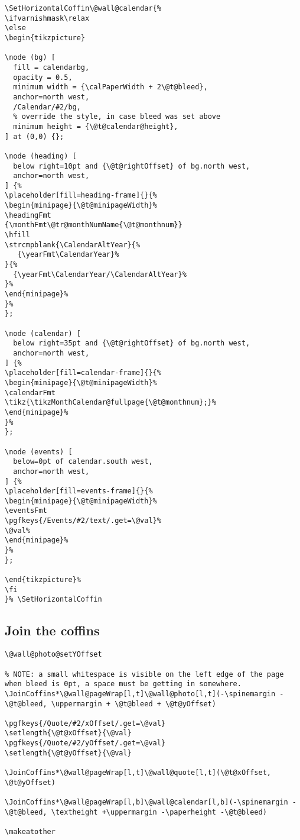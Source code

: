 \documentclass[11pt,oneside]{memoir-article}
\begin{document}
\begin{verbatim}
\SetHorizontalCoffin\@wall@calendar{%
\ifvarnishmask\relax
\else
\begin{tikzpicture}

\node (bg) [
  fill = calendarbg,
  opacity = 0.5,
  minimum width = {\calPaperWidth + 2\@t@bleed},
  anchor=north west,
  /Calendar/#2/bg,
  % override the style, in case bleed was set above
  minimum height = {\@t@calendar@height},
] at (0,0) {};

\node (heading) [
  below right=10pt and {\@t@rightOffset} of bg.north west,
  anchor=north west,
] {%
\placeholder[fill=heading-frame]{}{%
\begin{minipage}{\@t@minipageWidth}%
\headingFmt
{\monthFmt\@tr@monthNumName{\@t@monthnum}}
\hfill
\strcmpblank{\CalendarAltYear}{%
   {\yearFmt\CalendarYear}%
}{%
  {\yearFmt\CalendarYear/\CalendarAltYear}%
}%
\end{minipage}%
}%
};

\node (calendar) [
  below right=35pt and {\@t@rightOffset} of bg.north west,
  anchor=north west,
] {%
\placeholder[fill=calendar-frame]{}{%
\begin{minipage}{\@t@minipageWidth}%
\calendarFmt
\tikz{\tikzMonthCalendar@fullpage{\@t@monthnum};}%
\end{minipage}%
}%
};

\node (events) [
  below=0pt of calendar.south west,
  anchor=north west,
] {%
\placeholder[fill=events-frame]{}{%
\begin{minipage}{\@t@minipageWidth}%
\eventsFmt
\pgfkeys{/Events/#2/text/.get=\@val}%
\@val%
\end{minipage}%
}%
};

\end{tikzpicture}%
\fi
}% \SetHorizontalCoffin
\end{verbatim}

\subsection{Join the coffins}
\label{sec-10-4-5}

\begin{verbatim}
\@wall@photo@setYOffset

% NOTE: a small whitespace is visible on the left edge of the page when bleed is 0pt, a space must be getting in somewhere.
\JoinCoffins*\@wall@pageWrap[l,t]\@wall@photo[l,t](-\spinemargin -\@t@bleed, \uppermargin + \@t@bleed + \@t@yOffset)

\pgfkeys{/Quote/#2/xOffset/.get=\@val}
\setlength{\@t@xOffset}{\@val}
\pgfkeys{/Quote/#2/yOffset/.get=\@val}
\setlength{\@t@yOffset}{\@val}

\JoinCoffins*\@wall@pageWrap[l,t]\@wall@quote[l,t](\@t@xOffset, \@t@yOffset)

\JoinCoffins*\@wall@pageWrap[l,b]\@wall@calendar[l,b](-\spinemargin -\@t@bleed, \textheight +\uppermargin -\paperheight -\@t@bleed)

\makeatother
\end{verbatim}
\end{document}
